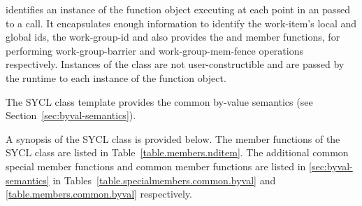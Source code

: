  identifies an instance of the function object
executing at each point in an  passed to a
 call. It encapsulates enough
information to identify the \gls{work-item}'s local and global \glspl{id}, the
\gls{work-group-id} and also provides the  and  member functions, for performing \gls{work-group-barrier} and \gls{work-group-mem-fence} operations respectively. Instances of the  class are not
user-constructible and are passed by the runtime to each instance of the
function object.

The SYCL  class template provides the common by-value
semantics (see Section~\ref{sec:byval-semantics}).

A synopsis of the SYCL  class is provided below. The member functions of the SYCL  class are listed in Table~\ref{table.members.nditem}. The additional common special member functions and common member functions are listed in \ref{sec:byval-semantics} in Tables~\ref{table.specialmembers.common.byval} and \ref{table.members.common.byval} respectively.



